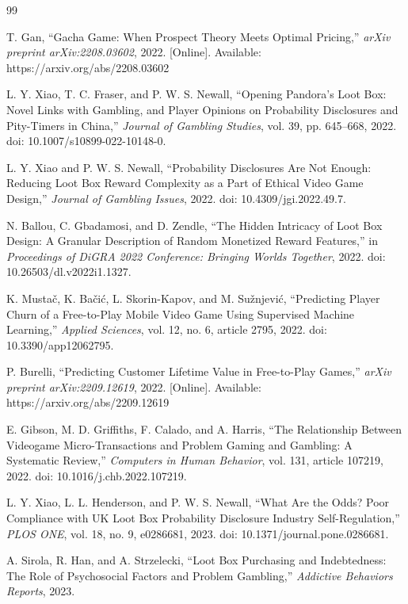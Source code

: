 \documentclass[sigconf,nonacm]{acmart}
\begin{document}
\begin{thebibliography}{99}

T. Gan, ``Gacha Game: When Prospect Theory Meets Optimal Pricing,'' \textit{arXiv preprint arXiv:2208.03602}, 2022. [Online]. Available: https://arxiv.org/abs/2208.03602

L. Y. Xiao, T. C. Fraser, and P. W. S. Newall, ``Opening Pandora's Loot Box: Novel Links with Gambling, and Player Opinions on Probability Disclosures and Pity-Timers in China,'' \textit{Journal of Gambling Studies}, vol. 39, pp. 645--668, 2022. doi: 10.1007/s10899-022-10148-0.

L. Y. Xiao and P. W. S. Newall, ``Probability Disclosures Are Not Enough: Reducing Loot Box Reward Complexity as a Part of Ethical Video Game Design,'' \textit{Journal of Gambling Issues}, 2022. doi: 10.4309/jgi.2022.49.7.

N. Ballou, C. Gbadamosi, and D. Zendle, ``The Hidden Intricacy of Loot Box Design: A Granular Description of Random Monetized Reward Features,'' in \textit{Proceedings of DiGRA 2022 Conference: Bringing Worlds Together}, 2022. doi: 10.26503/dl.v2022i1.1327.

K. Musta\v{c}, K. Ba\v{c}i\'{c}, L. Skorin-Kapov, and M. Su\v{z}njevi\'{c}, ``Predicting Player Churn of a Free-to-Play Mobile Video Game Using Supervised Machine Learning,'' \textit{Applied Sciences}, vol. 12, no. 6, article 2795, 2022. doi: 10.3390/app12062795.

P. Burelli, ``Predicting Customer Lifetime Value in Free-to-Play Games,'' \textit{arXiv preprint arXiv:2209.12619}, 2022. [Online]. Available: https://arxiv.org/abs/2209.12619

E. Gibson, M. D. Griffiths, F. Calado, and A. Harris, ``The Relationship Between Videogame Micro-Transactions and Problem Gaming and Gambling: A Systematic Review,'' \textit{Computers in Human Behavior}, vol. 131, article 107219, 2022. doi: 10.1016/j.chb.2022.107219.

L. Y. Xiao, L. L. Henderson, and P. W. S. Newall, ``What Are the Odds? Poor Compliance with UK Loot Box Probability Disclosure Industry Self-Regulation,'' \textit{PLOS ONE}, vol. 18, no. 9, e0286681, 2023. doi: 10.1371/journal.pone.0286681.

A. Sirola, R. Han, and A. Strzelecki, ``Loot Box Purchasing and Indebtedness: The Role of Psychosocial Factors and Problem Gambling,'' \textit{Addictive Behaviors Reports}, 2023.


\end{thebibliography}
\end{document}
